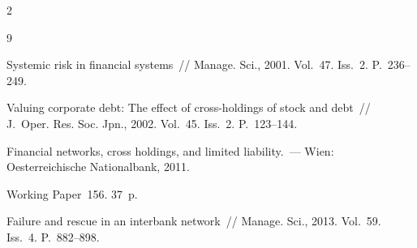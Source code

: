








\vspace*{-12pt}





 \begin{multicols}{2}



\renewcommand{\bibname}{\protect\rmfamily Литература}




{\small\frenchspacing

{%

\begin{thebibliography}{9}





\vspace*{-2pt}




 Systemic risk in financial systems~// Manage. Sci., 2001.  Vol.~47. Iss.~2. P.~236--249.




 Valuing corporate debt: The effect of cross-holdings of stock and debt~// J.~Oper. Res. Soc. Jpn., 2002. Vol.~45. Iss.~2. P.~123--144.




 Financial networks, cross holdings, and limited liability.~---  Wien: Oesterreichische Nationalbank, 2011. 

 Working Paper~156. 37~p.

 


 Failure and rescue in an interbank network~// Manage. Sci., 2013. Vol.~59. Iss.~4. P.~882--898.




\end{thebibliography}}}
\end{multicols}
